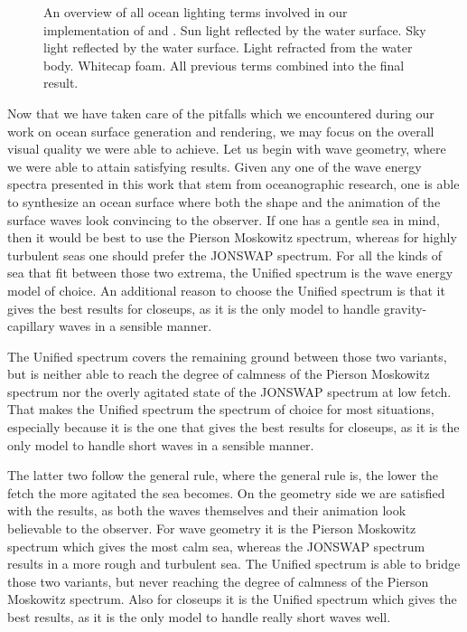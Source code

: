 \begin{figure}
{	\label{fig:results:complete}
 }
\caption[An overview of all ocean lighting terms involved in our implementation.]{
An overview of all ocean lighting terms involved in our implementation
of \citet{article:oceanlighting,misc:oceanlightingfft} and \citet{article:whitecaps}.
 Sun light reflected by the water surface.
 Sky light reflected by the water surface.
 Light refracted from the water body.
 Whitecap foam.
 All previous terms combined into the final
result.
}
\label{fig:results}
\end{figure}
%
Now that we have taken care of the pitfalls which we encountered during
our work on ocean surface generation and rendering, we may focus on the
overall visual quality we were able to achieve.
Let us begin with wave geometry, where we were able to attain satisfying
results. Given any one of the wave energy spectra presented in this work
that stem from oceanographic research, one is able to synthesize an ocean
surface where both the shape and the animation of the surface waves look
convincing to the observer. If one has a gentle sea in mind, then it would be
best to use the Pierson Moskowitz spectrum, whereas for highly turbulent seas
one should prefer the JONSWAP spectrum. For all the kinds of sea that fit
between those two extrema, the Unified spectrum is the wave energy model of
choice. An additional reason to choose the Unified spectrum is that it gives
the best results for closeups, as it is the only model to handle gravity-capillary waves in a sensible manner.

The Unified spectrum covers the
remaining ground between those two variants, but is neither able to reach
the degree of calmness of the Pierson Moskowitz spectrum nor the overly
agitated state of the JONSWAP spectrum at low fetch. That makes the Unified
spectrum the spectrum of choice for most situations, especially because it
is the one that gives the best results for closeups, as it is the only model
to handle short waves in a sensible manner.

The latter two follow the general rule, where the general rule
is, the lower the fetch the more agitated the sea becomes.
On the geometry side we are satisfied with the results, as both the waves
themselves and their animation look believable to the observer.
For wave geometry it is the Pierson Moskowitz spectrum which
gives the most calm sea, whereas the JONSWAP spectrum results in a
more rough and turbulent sea. The Unified spectrum is able to bridge
those two variants, but never reaching the degree of calmness of the Pierson Moskowitz spectrum. Also for closeups it is the Unified spectrum which gives the best results, as it is the only model to handle really short waves well.

